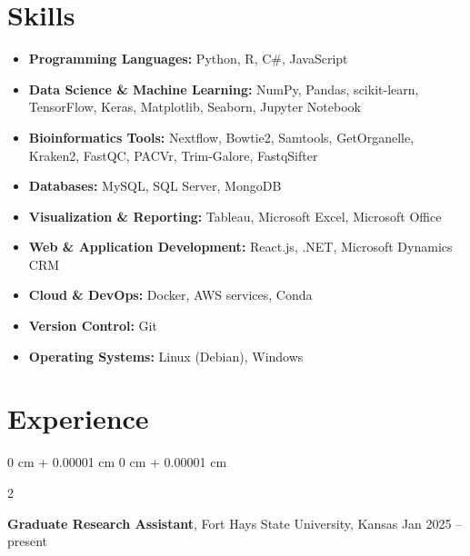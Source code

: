 \documentclass[10pt, letterpaper]{article}
\newenvironment{highlights}{
    \begin{itemize}[
        topsep=0.10 cm,
        parsep=0.10 cm,
        partopsep=0pt,
        itemsep=0.05cm,
        leftmargin=0 cm + 10pt
    ]
}{
    \end{itemize}
} %
\newenvironment{onecolentry}{
    \begin{adjustwidth}{
        0 cm + 0.00001 cm
    }{
        0 cm + 0.00001 cm
    }
}{
    \end{adjustwidth}
} %
\newenvironment{twocolentry}[2][]{
    \onecolentry
    \def\secondColumn{#2}
    \setcolumnwidth{\fill, 4.5 cm}
    \begin{paracol}{2}
}{
    \switchcolumn \raggedleft \secondColumn
    \end{paracol}
    \endonecolentry
} %
\begin{document}
    \section{Skills}
        \begin{highlights}
            \item \textbf{Programming Languages:} Python, R, C\#, JavaScript
            \item \textbf{Data Science \& Machine Learning:} NumPy, Pandas, scikit-learn, TensorFlow, Keras, Matplotlib, Seaborn, Jupyter Notebook
            \item \textbf{Bioinformatics Tools:} Nextflow, Bowtie2, Samtools, GetOrganelle, Kraken2, FastQC, PACVr, Trim-Galore, FastqSifter
            \item \textbf{Databases:} MySQL, SQL Server, MongoDB
            \item \textbf{Visualization \& Reporting:} Tableau, Microsoft Excel, Microsoft Office
            \item \textbf{Web \& Application Development:} React.js, .NET, Microsoft Dynamics CRM
            \item \textbf{Cloud \& DevOps:} Docker, AWS services, Conda
            \item \textbf{Version Control:} Git
            \item \textbf{Operating Systems:} Linux (Debian), Windows
        \end{highlights}
    \section{Experience}
     \begin{twocolentry}{
            Jan 2025 – present
        }
            \textbf{Graduate Research Assistant}, Fort Hays State University, Kansas\end{twocolentry}
\end{document}
